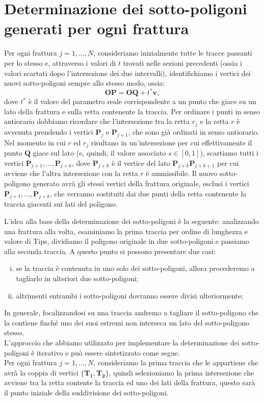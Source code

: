 \documentclass[a4paper]{article}
\newcommand{\B}{\mathbf}
\begin{document}
\section{Determinazione dei sotto-poligoni generati per ogni frattura}
Per ogni frattura $j=1,\dots,N$, consideriamo inizialmente tutte le tracce passanti per lo stesso e, attraverso i valori di $t$ trovati nelle sezioni precedenti (ossia i valori scartati dopo l'intersezione dei due intervalli), identifichiamo i vertici dei nuovi sotto-poligoni sempre allo stesso modo, ossia:$$\B{OP}=\B{OQ}+t^*\B{v},$$ dove $t^*$ è il valore del parametro reale corrispondente a un punto che giace su un lato della frattura e sulla retta contenente la traccia. Per ordinare i punti in senso antiorario dobbiamo ricordare che l'intersezione tra la retta $r_j$ e la retta $r$ è avvenuta prendendo i vertici $\B{P}_j$ e $\B{P}_{j+1}$, che sono già ordinati in senso antiorario. Nel momento in cui $r$ ed $r_j$ risultano in un'intersezione per cui effettivamente il punto $\B{Q}$ giace sul lato (e, quindi, il valore associato $s\in[0,1]$), scartiamo tutti i vertici $\B{P}_{j+1},\dots,\B{P}_{j+k}$, dove $\B{P}_{j+k}$ è il vertice del lato $\B{P}_{j+k}\B{P}_{j+k+1}$ per cui avviene che l'altra intersezione con la retta $r$ è ammissibile. Il nuovo sotto-poligono generato avrà gli stessi vertici della frattura originale, esclusi i vertici $\B{P}_{j+1},\dots,\B{P}_{j+k}$, che verranno sostituiti dai due punti della retta contenente la traccia giacenti sui lati del poligono. 

L'idea alla base della determinazione dei sotto-poligoni è la seguente: analizzando una frattura alla volta, esaminiamo la prima traccia per ordine di lunghezza e valore di Tips, dividiamo il poligono originale in due sotto-poligoni e passiamo alla seconda traccia. A questo punto si possono presentare due casi:
\begin{enumerate} [(i)]
\item  se la traccia è contenuta in uno solo dei sotto-poligoni, allora procederemo a tagliarlo in ulteriori due sotto-poligoni;
\item altrimenti entrambi i sotto-poligoni dovranno essere divisi ulteriormente;
\end{enumerate}

In generale, focalizzandosi su una traccia andremo a tagliare il sotto-poligono che la contiene finché uno dei suoi estremi non interseca un lato del sotto-poligono stesso. \\

L'approccio che abbiamo utilizzato per implementare la determinazione dei sotto-poligoni è iterativo e può essere sintetizzato come segue.  \\ [2mm] Per ogni frattura $j=1,\dots,N$, consideriamo la prima traccia che le appartiene che avrà la coppia di vertici $\{\B{T_{1}},\B{T_{2}}\}$, quindi selezioniamo la prima intersezione che avviene tra la retta contente la traccia ed uno dei lati della frattura, questo sarà il punto iniziale della suddivisione dei sotto-poligoni. 
\end{document}
